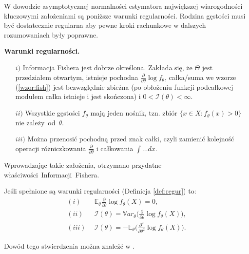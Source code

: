 W dowodzie asymptotycznej normalności estymatora największej wiarogodności kluczowymi założeniami są poniższe warunki regularności. Rodzina gęstości musi być dostatecznie regularna aby pewne kroki rachunkowe w dalszych rozumowaniach były
poprawne.

\begin{definition}\label{def:regur}
\textbf{Warunki regularności.}
\end{definition}
\begin{itemize}
\item[$i)$] Informacja Fishera jest dobrze określona. Zakłada się, że $\Theta$ jest przedziałem
otwartym, istnieje pochodna $\frac{\partial}{\partial\theta}\log f_{\theta}$, całka/suma we wzorze
(\ref{wzor:fish}) jest bezwzględnie zbieżna (po obłożeniu funkcji podcałkowej modułem całka istnieje i jest skończona) i $0 < \mathcal{I}(\theta) < \infty$.
\item[$ii)$] Wszystkie gęstości $f_\theta$ mają jeden nośnik, tzn. zbiór $\{x \in X : f_\theta(x) > 0\}$ nie zależy~od~$\theta$.
\item[$iii)$] Można przenosić pochodną przed znak całki, czyli zamienić kolejność
operacji różniczkowania $\frac{\partial}{\partial\theta}$ i całkowania $\int \dots dx$.
\end{itemize}

Wprowadzając takie założenia, otrzymano przydatne właściwości~Informacji~Fishera.

\begin{proposition}\label{prop:warunki}
Jeśli spełnione są warunki regularności (Definicja \ref{def:regur}) to:
\begin{align*}
(i) \ & \ \mathbb{E}_\theta\frac{\partial}{\partial\theta}\log f_{\theta}(X) = 0, \\
(ii) \ & \ \mathcal{I}(\theta) = \mathbb{V}ar_{\theta}\Big(\frac{\partial}{\partial\theta}\log f_{\theta}(X) \Big), \\
(iii) \ & \ \mathcal{I}(\theta) = -\mathbb{E}_{\theta}\Big(\frac{\partial^2}{\partial\theta^2}\log f_\theta(X) \Big).
\end{align*}
\end{proposition}

Dowód tego stwierdzenia można znaleźć w \cite{niemiro}.

